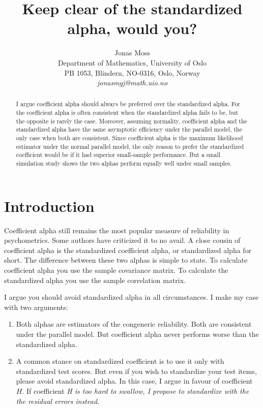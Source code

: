 \documentclass{article}
\title{Keep clear of the standardized alpha, would you?}
\author{
  Jonas Moss \\
  Department of Mathematics, University of Oslo\\
  PB 1053, Blindern, NO-0316, Oslo, Norway \\
  \it{jonasmgj@math.uio.no}
}
\theoremstyle{plain}
\theoremstyle{plain}
\theoremstyle{definition}
\theoremstyle{remark}
\theoremstyle{definition}
\theoremstyle{plain}
\theoremstyle{plain}
\theoremstyle{definition}
\begin{document}
\maketitle

\begin{abstract}
I argue coefficient alpha should always be preferred over the standardized alpha. For the coefficient alpha is often consistent when the standardized alpha fails to be, but the opposite is rarely the case. Moreover, assuming normality, coefficient alpha and the standardized alpha have the same asymptotic efficiency under the parallel model, the only case when both are consistent. Since coefficient alpha is the maximum likelihood estimator under the normal parallel model, the only reason to prefer the standardized coefficient would be if it had superior small-sample performance. But a small simulation study shows the two alphas perform equally well under small samples.
\end{abstract}


\section{Introduction}
Coefficient alpha still remains the most popular measure of reliability in psychometrics. Some authors have criticized it to no avail. A close cousin of coefficient alpha is the standardized coefficient alpha, or standardized alpha for short. The difference between these two alphas is simple to state. To calculate coefficient alpha you use the sample covariance matrix. To calculate the standardized alpha you use the sample correlation matrix.

I argue you should avoid standardized alpha in all circumstances. I make my case with two arguments:

\begin{enumerate}[label=\arabic*.]
\item Both alphas are estimators of the congeneric reliability. Both are consistent under the parallel model. But coefficient alpha never performs worse than the standardized alpha.

\item A common stance on standardized coefficient is to use it only with standardized test scores. But even if you wish to standardize your test items, please avoid standardized alpha.  In this case, I argue in favour of coefficient $H$. If coefficient \it{H} is too hard to swallow, I propose to standardize with the the residual errors instead.
\end{enumerate}
\end{document}
